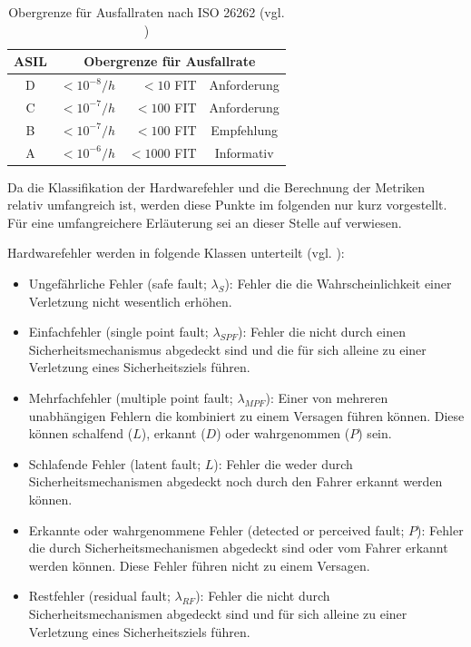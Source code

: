 \documentclass[a4paper,DIV=calc,ngerman]{scrartcl}
\begin{document}
\begin{table}[h]
\center
\begin{tabular}[h]{c r r c}
\toprule
ASIL & \multicolumn{3}{c}{Obergrenze für Ausfallrate}\\
\midrule
D & $ <10^{-8}/h $ & $ <10 $ FIT & Anforderung\\
C & $ <10^{-7}/h $ & $ <100 $ FIT   & Anforderung\\
B & $ <10^{-7}/h $ & $ <100 $ FIT   & Empfehlung\\
A & $ <10^{-6}/h $ & $ <1000 $ FIT   & Informativ\\
\bottomrule
\end{tabular}
\caption{Obergrenze für Ausfallraten nach ISO 26262 (vgl. \cite[S. 133]{1})}
\label{tab:ausfallrate}
\end{table}

Da die Klassifikation der Hardwarefehler und die Berechnung der Metriken relativ umfangreich ist, werden diese Punkte im folgenden nur kurz vorgestellt. Für eine umfangreichere Erläuterung sei an dieser Stelle auf \cite[S. 135 ff.]{1} verwiesen.

Hardwarefehler werden in folgende Klassen unterteilt (vgl. \cite[S. 136]{1}):

\begin{itemize}
    \item Ungefährliche Fehler (safe fault; $ \lambda_S $): Fehler die die Wahrscheinlichkeit einer Verletzung nicht wesentlich erhöhen.
    \item Einfachfehler (single point fault; $ \lambda_{SPF} $): Fehler die nicht durch einen Sicherheitsmechanismus abgedeckt sind und die für sich alleine zu einer Verletzung eines Sicherheitsziels führen.
    \item Mehrfachfehler (multiple point fault; $ \lambda_{MPF} $): Einer von mehreren unabhängigen Fehlern die kombiniert zu einem Versagen führen können. Diese können schalfend ($L$), erkannt ($D$) oder wahrgenommen ($P$) sein.
    \item Schlafende Fehler (latent fault; $ L $): Fehler die weder durch Sicherheitsmechanismen abgedeckt noch durch den Fahrer erkannt werden können.
    \item Erkannte oder wahrgenommene Fehler (detected or perceived fault; $ P $): Fehler die durch Sicherheitsmechanismen abgedeckt sind oder vom Fahrer erkannt werden können. Diese Fehler führen nicht zu einem Versagen.
    \item Restfehler (residual fault; $ \lambda_{RF} $): Fehler die nicht durch Sicherheitsmechanismen abgedeckt sind und für sich alleine zu einer Verletzung eines Sicherheitsziels führen.
\end{itemize}
\end{document}
